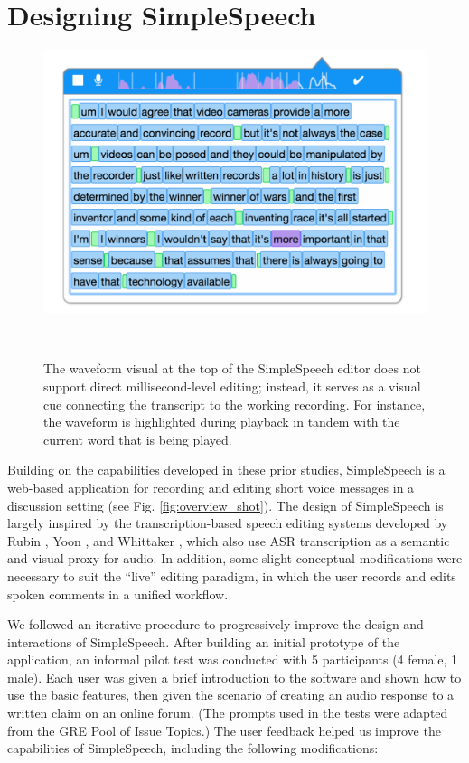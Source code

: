 
\section{Designing SimpleSpeech}

\begin{figure}
	\centering
	\includegraphics[width=\columnwidth,keepaspectratio]{figures/playback}
	\caption{The waveform visual at the top of the SimpleSpeech editor does not support direct millisecond-level editing; instead, it serves as a visual cue connecting the transcript to the working recording. For instance, the waveform is highlighted during playback in tandem with the current word that is being played.}~\label{fig:playback}
\end{figure}

Building on the capabilities developed in these prior studies, SimpleSpeech is a web-based application for recording and editing short voice messages in a discussion setting (see Fig. \ref{fig:overview_shot}).
The design of SimpleSpeech is largely inspired by the transcription-based speech editing systems developed by Rubin \cite{rubin}, Yoon \cite{yoon}, and Whittaker \cite{whittaker_semantic}, which also use ASR transcription as a semantic and visual proxy for audio.
In addition, some slight conceptual modifications were necessary to suit the ``live'' editing paradigm, in which the user records and edits spoken comments in a unified workflow.

We followed an iterative procedure to progressively improve the design and interactions of SimpleSpeech.
After building an initial prototype of the application, an informal pilot test was conducted with 5 participants (4 female, 1 male). 
Each user was given a brief introduction to the software and shown how to use the basic features, then given the scenario of creating an audio response to a written claim on an online forum. 
(The prompts used in the tests were adapted from the GRE Pool of Issue Topics.)
The user feedback helped us improve the capabilities of SimpleSpeech, including the following modifications:

